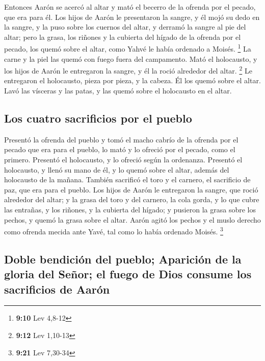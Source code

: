 \begin{paracol}{2}
 Entonces Aarón se acercó al altar y mató el becerro de la
ofrenda por el pecado, que era para él.  Los hijos de
Aarón le presentaron la sangre, y él mojó su dedo en la sangre, y la
puso sobre los cuernos del altar, y derramó la sangre al pie del altar;
 pero la grasa, los riñones y la cubierta del hígado de
la ofrenda por el pecado, los quemó sobre el altar, como Yahvé le había
ordenado a Moisés. \footnote{\textbf{9:10} Lev 4,8-12} 
La carne y la piel las quemó con fuego fuera del campamento.
 Mató el holocausto, y los hijos de Aarón le entregaron
la sangre, y él la roció alrededor del altar. \footnote{\textbf{9:12}
  Lev 1,10-13}  Le entregaron el holocausto, pieza por
pieza, y la cabeza. Él los quemó sobre el altar.  Lavó
las vísceras y las patas, y las quemó sobre el holocausto en el altar.

\hypertarget{los-cuatro-sacrificios-por-el-pueblo}{%
\subsection{Los cuatro sacrificios por el
pueblo}\label{los-cuatro-sacrificios-por-el-pueblo}}

 Presentó la ofrenda del pueblo y tomó el macho cabrío de
la ofrenda por el pecado que era para el pueblo, lo mató y lo ofreció
por el pecado, como el primero.  Presentó el holocausto,
y lo ofreció según la ordenanza.  Presentó el holocausto,
y llenó su mano de él, y lo quemó sobre el altar, además del holocausto
de la mañana.  También sacrificó el toro y el carnero, el
sacrificio de paz, que era para el pueblo. Los hijos de Aarón le
entregaron la sangre, que roció alrededor del altar;  y
la grasa del toro y del carnero, la cola gorda, y lo que cubre las
entrañas, y los riñones, y la cubierta del hígado;  y
pusieron la grasa sobre los pechos, y quemó la grasa sobre el altar.
 Aarón agitó los pechos y el muslo derecho como ofrenda
mecida ante Yavé, tal como lo había ordenado Moisés. \footnote{\textbf{9:21}
  Lev 7,30-34}

\hypertarget{doble-bendiciuxf3n-del-pueblo-apariciuxf3n-de-la-gloria-del-seuxf1or-el-fuego-de-dios-consume-los-sacrificios-de-aaruxf3n}{%
\subsection{Doble bendición del pueblo; Aparición de la gloria del
Señor; el fuego de Dios consume los sacrificios de
Aarón}\label{doble-bendiciuxf3n-del-pueblo-apariciuxf3n-de-la-gloria-del-seuxf1or-el-fuego-de-dios-consume-los-sacrificios-de-aaruxf3n}}


\end{paracol}
